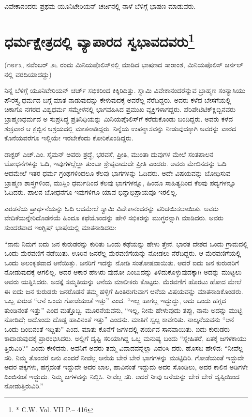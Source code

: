 ವಿವೇಕಾನಂದರು ಪ್ರಥಮ ಯೂನಿಟೇರಿಯನ್​ ಚರ್ಚಿನಲ್ಲಿ ನಾಳೆ ಬೆಳಿಗ್ಗೆ ಭಾಷಣ ಮಾಡುವರು.

\delimiter


\section[ಧರ್ಮಕ್ಷೇತ್ರದಲ್ಲಿ ವ್ಯಾಪಾರದ ಸ್ವಭಾವದವರು]{ಧರ್ಮಕ್ಷೇತ್ರದಲ್ಲಿ ವ್ಯಾಪಾರದ ಸ್ವಭಾವದವರು\protect\footnote{* C.W. Vol. VII P.– 416}}

(೧೮೯೩, ನವೆಂಬರ್​ ೨೬ ರಂದು ಮಿನಿಯಪೊಲಿಸ್​ನಲ್ಲಿ ಮಾಡಿದ ಭಾಷಣದ ಸಾರಾಂಶ, ಮಿನಿಯಪೊಲಿಸ್​ ಜರ್ನಲ್​ನಲ್ಲಿ ವರದಿಯಾದದ್ದು)

ನಿನ್ನೆ ಬೆಳಿಗ್ಗೆ ಯೂನಿಟೇರಿಯನ್​ ಚರ್ಚ್​ ಸಭಿಕರಿಂದ ಕಿಕ್ಕಿರಿದಿತ್ತು. ಸ್ವಾಮಿ ವಿವೇಕಾನಂದರೆನ್ನುವ ಬ್ರಾಹ್ಮಣ ಸಂನ್ಯಾಸಿಯು ಪೌರಸ್ತ್ಯ ಧರ್ಮದ ಬಗ್ಗೆ ಮಾತ ನಾಡುವುದನ್ನು ಕೇಳುವುದಕ್ಕೆ ಅವರೆಲ್ಲ ನೆರೆದಿದ್ದರು. ಅವರು ಕಳೆದ ಬೇಸಗೆಯಲ್ಲಿ ಚಿಕಾಗೊ ನಗರದ ವಿಶ್ವಧರ್ಮ ಸಮ್ಮೇಳನಲ್ಲಿ ಭಾಗವಹಿಸಿದ ಪ್ರಮುಖ ವ್ಯಕ್ತಿಗಳಾಗದ್ದರು. ಪೆರಿಪೇಟಿಟಿಕ್​ ಕ್ಲಬ್ಬಿನವರು ಬ್ರಾಹ್ಮಣಧರ್ಮದ ಅ ಸುಪ್ರಸಿದ್ಧ ಪ್ರತಿನಿಧಿಯನ್ನು ಮಿನಿಯಪೊಲಿಸ್​ಗೆ ಕರೆದುಕೊಂಡು ಬಂದಿದ್ದರು. ಅವರು ಕಳೆದ ಶುಕ್ರವಾರ ಆ ಕ್ಲಬ್ಬಿನ ಆಶ್ರಯದಲ್ಲಿ ಮಾತನಾಡಿದ್ದರು. ನಿನ್ನೆಯ ಉಪನ್ಯಾಸವನ್ನು ನೀಡುವುದಕ್ಕಾಗಿ ಅವರನ್ನು ವಾರದ ಕೊನೆಯವರೆಗೂ ಇಲ್ಲಿಯೇ ಇರಬೇಕೆಂದು ಕೋರಿಕೊಂಡಿದ್ದರು.

ಡಾಕ್ಟರ್​ ಎಚ್​.ಎಂ. ಸೈಮನ್​ ಅವರು ಶ್ರದ್ಧೆ, ಭರವಸೆ, ಪ್ರೀತಿ, ಮುಂತಾ ದುವುಗಳ ಮೇಲೆ ಸಂತಪಾಲನ ಬೋಧನೆಗಳನ್ನು ಓದಿ, ಇವುಗಳಲ್ಲೆಲ್ಲಾ ತುಂಬಾ ಶ್ರೇಷ್ಠವಾದುದೇ ಪ್ರೀತಿ ಎಂದರು. ಅವರು ಮೇಲಿನದನ್ನು ಓದಿ ಆದಮೇಲೆ ಇತರ ಧರ್ಮ ಗ್ರಂಥಗಳಿಂದಲೂ ಕೆಲವು ಭಾಗಗಳನ್ನು ಓದಿದರು. ಅದೇ ವಿಷಯವನ್ನು ಬೋಧಿಸುವ ಬ್ರಾಹ್ಮಣ ಶಾಸ್ತ್ರಗಳಿಂದ, ಮುಸ್ಲಿಂ ಧರ್ಮದಿಂದ ಕೆಲವು ಭಾಗಗಳನ್ನೂ, ಹಿಂದೂ ಸಾಹಿತ್ಯದಿಂದ ಕೆಲವು ಪದ್ಯಗಳನ್ನೂ ಓದಿದರು. ಪಾಲನ ಬೋಧನೆಗೂ ಇವುಗಳಿಗೂ ಯಾವ ಭಿನ್ನಾಭಿಪ್ರಾಯವೂ ಇರಲಿಲ್ಲ.

ಎರಡನೆಯ ಪ್ರಾರ್ಥನೆಯನ್ನು ಓದಿ ಆದಮೇಲೆ ಸ್ವಾಮಿ ವಿವೇಕಾನಂದರನ್ನು ಪರಿಚಯಿಸಲಾಯಿತು. ಅವರು ವೇದಿಕೆಯನ್ನೇರಿದೊಡನೆಯೆ ಹಿಂದೂ ಕಥೆಯೊಂದನ್ನು ಹೇಳಿ ಸಭಿಕರನ್ನು ಮುಗ್ಧರನ್ನಾಗಿ ಮಾಡಿದರು. ಅವರು ಸುಂದರವಾದ ಇಂಗ್ಲಿಷ್​ ಭಾಷೆಯಲ್ಲಿ ಮಾತನಾಡಿದರು:

“ನಾನು ನಿಮಗೆ ಐದು ಜನ ಕುರುಡರನ್ನು ಕುರಿತು ಒಂದು ಕಥೆಯನ್ನು ಹೇಳು ತ್ತೇನೆ. ಭಾರತ ದೇಶದ ಒಂದು ಗ್ರಾಮದಲ್ಲಿ ಒಂದು ಮೆರವಣಿಗೆ ನಡೆಯಿತು. ಊರಿನ ಜನರೆಲ್ಲ ಮೆರವಣಿಗೆಯನ್ನು ನೋಡಲು ನೆರೆದಿದ್ದರು. ಆ ಮೆರವಣಿಗೆಯಲ್ಲಿ ಒಂದು ಅಲಂಕೃತವಾದ ಆನೆಯಿತ್ತು. ಜನರಿಗೆ ಇದನ್ನು ನೋಡಿ ಸಂತೋಷವಾಯಿತು. ಆದರೆ ಐದು ಜನ ಕುರುಡರಿಗೆ ನೋಡುವುದಕ್ಕೆ ಆಗಲಿಲ್ಲ. ಅದರ ಆಕಾರ ಹೇಗಿರು ವುದೋ ಎಂಬುದನ್ನು ತಿಳಿದುಕೊಳ್ಳುವುದಕ್ಕಾಗಿ ಅದನ್ನು ಮುಟ್ಟಲು ಅವರು ಯತ್ನಿಸಿದರು. ಅದಕ್ಕೆ ಸಮ್ಮತಿಯನ್ನು ಆನೆಯ ಮಾಲೀಕರು ಕೊಟ್ಟರು. ಮೆರವಣಿಗೆ ಹೊರಟು ಹೋದ ಮೇಲೆ ಈ ಐದು ಜನ ಕುರುಡರು ಜನರೊಡನೆ ತಮ್ಮ ಹಳ್ಳಿಗೆ ಹಿಂತಿರುಗುವಾಗ ಆನೆಯ ವಿಷಯವನ್ನು ಮಾತನಾಡಿಕೊಂಡರು. ಒಬ್ಬ ಕುರುಡ “ಆನೆ ಒಂದು ಗೋಡೆಯಂತೆ ಇತ್ತು” ಎಂದ. “ಇಲ್ಲ ಹಾಗಲ್ಲ ಇದ್ದುದ್ದು, ಅದು ಒಂದು ಹಗ್ಗದ ತುಂಡಿನಂತೆ ಇತ್ತು” ಎಂದ ಮತ್ತೊಬ್ಬ. ಮೂರನೆಯವನು, “ಇಲ್ಲ, ನೀನು ಹೇಳುವುದು ತಪ್ಪು, ನಾನು ಅದನ್ನು ಮುಟ್ಟಿ ನೋಡಿದೆ; ಅದೊಂದು ದೊಡ್ಡ ಹಾವಿನಂತೆ ಇತ್ತು” ಎಂದನು. ಮಾತಿಗೆ ಸ್ವಲ್ಪ ಕಾವೇರಿತು. ನಾಲ್ಕನೆಯವನು “ಆನೆ ಒಂದು ದಿಂಬಿನಂತೆ ಇದ್ದಿತು” ಎಂದ. ಮಾತು ಕೊನೆಗೆ ಜಗಳದಲ್ಲಿ ಪರ್ಯವ ಸಾನವಾಯಿತು. ಐದು ಕುರುಡರು ಕಾದಾಡುವುದಕ್ಕೆ ಪ್ರಾರಂಭಿಸಿದರು. ಅಲ್ಲಿಗೆ ದೃಷ್ಟಿ ಸರಿಯಾಗಿದ್ದ ಒಬ್ಬ ಮನುಷ್ಯ ಬಂದು “ಸ್ನೇಹಿತರೆ, ಏತಕ್ಕೆ ಜಗಳಕಾಯು ತ್ತಿರುವಿರಿ?” ಎಂದು ಕೇಳಿದನು. ಅವನಿಗೆ ಅವರು ತಮ್ಮ ವಿವಾದವನ್ನೆಲ್ಲಾ ವಿವರಿಸಿ ದರು. ಹೊಸಬ ಹೇಳಿದ: “ನೀವೆಲ್ಲ ಸರಿ. ನಿಮ್ಮ ತೊಂದರೆ ಏನು ಎಂದರೆ ನೀವೆಲ್ಲ ಆನೆಯ ಬೇರೆ ಬೇರೆ ಭಾಗಗಳನ್ನು ಮುಟ್ಟಿದಿರಿ. ಗೋಡೆಯಂತೆ ಇದ್ದುದೇ ಅದರ ಪಕ್ಕಗಳು, ಹಗ್ಗದಂತೆ ಇದ್ದುದೇ ಅದರ ಬಾಲ, ಹಾವಿನಂತೆ ಇದ್ದುದು ಅದರ ಸೊಂಡಿಲು, ಅದರ ಕಾಲಿನ ಅಡಿಗಳೇ ದಿಂಬಿನಂತೆ ಇದ್ದುದು. ನಿಮ್ಮ ಜಗಳವನ್ನು ನಿಲ್ಲಿಸಿ. ನೀವೆಲ್ಲ ಸರಿ. ಆದರೆ ನೀವು ಆನೆಯನ್ನು ಬೇರೆ ಬೇರೆ ದೃಷ್ಠಿಯಿಂದ ನೋಡುತ್ತಿರುವಿರಿ.”

